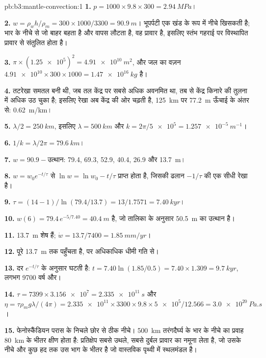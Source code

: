 \begin{solution}{pb:b3:mantle-convection:1}
\textbf{1.} $p = 1000\times9.8\times300 = \qty{2.94}{MPa}$।

\textbf{2.} $w = \rho_wh/\rho_m = 300\times1000/3300 = \qty{90.9}{m}$। भूपर्पटी
एक खंड के रूप में नीचे खिसकती है; भार के नीचे से जो बाहर बहता है और वापस लौटता है,
वह प्रावार है, इसलिए स्तंभ गहराई पर विस्थापित प्रावार से संतुलित होता है।

\textbf{3.} $\pi\times(\num{1.25e5})^2 = \qty{4.91e10}{m^2}$, और जल का
वज़न $\num{4.91e10}\times300\times1000 = \qty{1.47e16}{kg}$ है।

\textbf{4.} तटरेखा समतल बनी थी, जब तल केंद्र पर सबसे अधिक अवनमित था,
तब से केंद्र किनारे की तुलना में अधिक उठ चुका है; इसलिए रेखा अब
केंद्र की ओर चढ़ती है, \qty{125}{km} पर \qty{77.2}{m} ऊँचाई के अंतर से:
\qty{0.62}{m/km}।

\textbf{5.} $\lambda/2 = \qty{250}{km}$, इसलिए $\lambda = \qty{500}{km}$ और $k =
2\pi/\num{5e5} = \qty{1.257e-5}{m^{-1}}$।

\textbf{6.} $1/k = \lambda/2\pi = \qty{79.6}{km}$।

\textbf{7.} $w = 90.9 - \text{उत्थान}$: 79.4, 69.3, 52.9, 40.4, 26.9 और
\qty{13.7}{m}।

\textbf{8.} $w = w_0e^{-t/\tau}$ से $\ln w = \ln w_0 - t/\tau$ प्राप्त होता है,
जिसकी ढलान $-1/\tau$ की एक सीधी रेखा है।

\textbf{9.} $\tau = (14 - 1)/\ln(79.4/13.7) = 13/1.7571 = \qty{7.40}{kyr}$।

\textbf{10.} $w(6) = 79.4\,e^{-5/7.40} = \qty{40.4}{m}$ है, जो
तालिका के अनुसार \qty{50.5}{m} का उत्थान है।

\textbf{11.} \qty{13.7}{m} शेष हैं; $\dot w = 13.7/7400 = \qty{1.85}{mm/yr}$।

\textbf{12.} पूरे \qty{13.7}{m} तक पहुँचता है, पर अधिकाधिक धीमी गति से।

\textbf{13.} दर $e^{-t/\tau}$ के अनुसार घटती है: $t = 7.40\ln(1.85/0.5) =
7.40\times1.309 = \qty{9.7}{kyr}$, लगभग 9700 वर्ष और।

\textbf{14.} $\tau = 7399\times\num{3.156e7} = \qty{2.335e11}{s}$ और $\eta =
\tau\rho_mg\lambda/(4\pi) = \num{2.335e11}\times3300\times9.8\times\num{5e5}/
12.566 = \qty{3.0e20}{Pa.s}$।

\textbf{15.} फेनोस्कैंडियन परास के निचले छोर से ठीक नीचे। \qty{500}{km} तरंगदैर्घ्य के भार के नीचे का प्रवाह
\qty{80}{km} के भीतर क्षीण होता है:
प्रतिक्षेप सबसे उथले, सबसे दुर्बल प्रावार का नमूना लेता है, जो उसके नीचे और कुछ हद तक
उस भाग के भीतर है जो वास्तविक पृथ्वी में स्थलमंडल है।


\end{solution}
